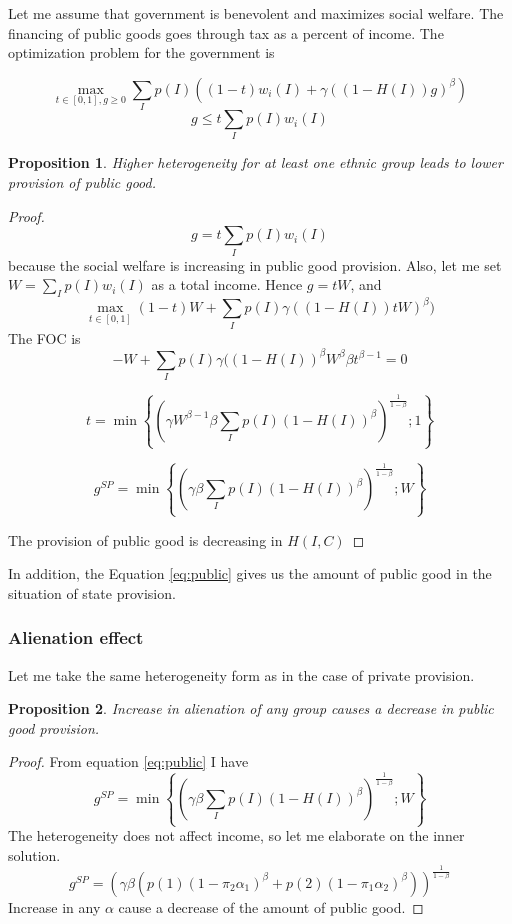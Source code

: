 \documentclass[12pt]{article}
\newtheorem{proposition}{Proposition}
\begin{document}
Let me assume that government is benevolent and maximizes social welfare. The financing of public goods goes through tax as a percent of income. The optimization problem for the government is

\[ \max_{t\in[0,1], g\ge 0} \sum_{I} p(I) ( (1-t)w_i(I) + \gamma( (1 - H(I)) g)^\beta)  \]
\[ g \le t\sum_{I} p(I) w_i(I)  \]

\begin{proposition}
Higher heterogeneity for at least one ethnic group leads to lower provision of public good.
\end{proposition}

\begin{proof}

\[ g = t\sum_{I} p(I) w_i(I)  \]
because the social welfare is increasing in public good provision. 
Also, let me set $W = \sum_{I} p(I) w_i(I) $ as a total income. Hence $g = tW$, and
\[ \max_{t\in[0,1]} (1-t) W + \sum_{I} p(I) \gamma( (1 - H(I)) tW)^\beta)  \]
The FOC is 
\[ -W + \sum_{I} p(I) \gamma ((1 - H(I))^\beta W^\beta \beta t^{\beta - 1} = 0 \]

\[t = \min \left\{ \left( \gamma W^{\beta - 1} \beta\sum_{I} p(I) (1 - H(I))^\beta \right)^\frac{1}{1 - \beta}; 1 \right\} \]

\begin{equation}
    g^{SP} = \min \left\{ \left( \gamma  \beta\sum_{I} p(I) (1 - H(I))^\beta \right)^\frac{1}{1 - \beta}; W \right\}
    \label{eq:public}
\end{equation}

The provision of public good is decreasing in $H(I,C)$
\end{proof}

In addition, the Equation \ref{eq:public} gives us the amount of public good in the situation of state provision.

\subsubsection{Alienation effect}

Let me take the same heterogeneity form as in the case of private provision.

\begin{proposition}
    Increase in alienation of any group causes a decrease in public good provision.
\end{proposition}

\begin{proof}
    From equation \ref{eq:public} I have 
    \[ g^{SP} = \min \left\{ \left( \gamma  \beta\sum_{I} p(I) (1 - H(I))^\beta \right)^\frac{1}{1 - \beta}; W \right\} \]
    The heterogeneity does not affect income, so let me elaborate on the inner solution.
    \[ g^{SP} = \left( \gamma  \beta \left( p(1) (1 - \pi_2\alpha_1)^\beta + p(2) (1 - \pi_1\alpha_2)^\beta  \right) \right)^\frac{1}{1 - \beta} \]
    Increase in any $\alpha$ cause a decrease of the amount of public good.
\end{proof}
\end{document}
